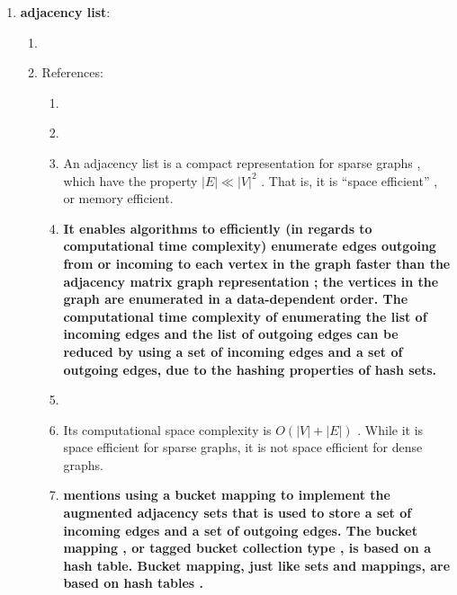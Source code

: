 \begin{enumerate}
\begin{enumerate}
\begin{enumerate}
		\end{enumerate}
	\end{enumerate}
\item {\bf adjacency list}: \vspace{-0.3cm}
	\begin{enumerate} \itemsep -2pt
	\item \cite[\S52.7, pp. 850-854]{Goldman2008}
	\item References: \vspace{-0.2cm}
		\begin{enumerate} \itemsep -2pt
		\item \cite{WikipediaContributors2018a49}
		\item \cite[\S52.7, pp. 854; \S52.6--\S52.7, pp. 851--856; \S55, pp. 901--915]{Goldman2008}
		\item An adjacency list is a compact representation for sparse graphs \cite[\S54, pp. 883]{Goldman2008}, which have the property $|E| \ll |V|^{2}$ \cite[\S22.1, pp. 589]{Cormen2009}. That is, it is ``space efficient'' \cite[\S55, pp. 901]{Goldman2008}, or memory efficient.
		\item {\bf It enables algorithms to efficiently (in regards to computational time complexity) enumerate edges outgoing from or incoming to each vertex in the graph faster than the adjacency matrix graph representation \cite[\S55, pp. 901]{Goldman2008}; the vertices in the graph are enumerated in a data-dependent order. The computational time complexity of enumerating the list of incoming edges and the list of outgoing edges can be reduced by using a set of incoming edges and a set of outgoing edges, due to the hashing properties of hash sets.}
		\item \cite[\S5, pp. 79]{Cormen2013}
		\item Its computational space complexity is $O(|V|+|E|)$ \cite[\S13.2, pp. 600]{Goodrich2011} \cite[\S14.2, pp. 627]{Goodrich2013} \cite{WikipediaContributors2018a49}. While it is space efficient for sparse graphs, it is not space efficient for dense graphs.
		\item {\bf \cite[\S55.1, pp. 904]{Goldman2008} mentions using a bucket mapping \cite[\S55.1, pp. 904; \S50.3, pp. 829; \S2.6.2, pp. 27; \S50; \S29.5, pp. 447]{Goldman2008} to implement the augmented adjacency sets that is used to store a set of incoming edges and a set of outgoing edges. The bucket mapping \cite[\S55.1, pp. 904; \S50.3, pp. 829]{Goldman2008}, or tagged bucket collection type \cite[\S2.6, pp. 25; \S55.3.1, pp. 906]{Goldman2008}, is based on a hash table. Bucket mapping, just like sets and mappings, are based on hash tables \cite[\S1.5, pp. 9]{Goldman2008}.}

\end{enumerate}
\end{enumerate}
\end{enumerate}
